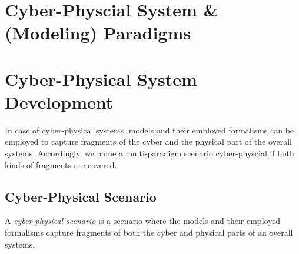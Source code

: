 \section{Cyber-Physcial System \& (Modeling) Paradigms}	

\section{Cyber-Physical System Development}

In case of cyber-physical systems, models and their employed formalisms can be employed to capture fragments of the cyber and the physical part of the overall systems. Accordingly, we name a multi-paradigm scenario cyber-physcial if both kinds of fragments are covered. 

\subsection{Cyber-Physical Scenario}

\begin{definition}
A \emph{cyber-physical scenario} is a scenario where the models and their employed formalisms capture fragments of both the cyber and  physical parts of an overall systems. 
\end{definition}

